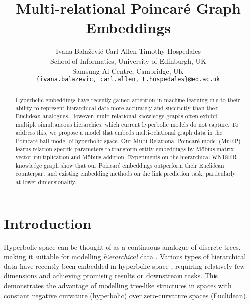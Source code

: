 \documentclass{article}
\title{Multi-relational Poincar{\'e} Graph Embeddings}
\author{Ivana Bala\v{z}evi\'c \hspace{1.cm} Carl Allen \hspace{1.cm} Timothy Hospedales\\
   School of Informatics, University of Edinburgh, UK\\
   Samsung AI Centre, Cambridge, UK \\
  \texttt{\{ivana.balazevic, carl.allen, t.hospedales\}@ed.ac.uk} \\
}
\begin{document}
\maketitle

\begin{abstract}
 Hyperbolic embeddings have recently gained attention in machine learning due to their ability to represent hierarchical data more accurately and succinctly than their Euclidean analogues. However, multi-relational knowledge graphs often exhibit multiple simultaneous hierarchies, which current hyperbolic models do not capture. To address this, we propose a model that embeds multi-relational graph data in the Poincar{\'e} ball model of hyperbolic space. Our Multi-Relational Poincar{\'e} model (MuRP) learns relation-specific parameters to transform entity embeddings by Möbius matrix-vector multiplication and Möbius addition. Experiments on the hierarchical WN18RR knowledge graph show that our Poincar{\'e} embeddings outperform their Euclidean counterpart and existing embedding methods on the link prediction task, particularly at lower dimensionality.
\end{abstract}

\section{Introduction}\label{sec:intro}

Hyperbolic space can be thought of as a continuous analogue of discrete trees, making it suitable for
modelling \textit{hierarchical} data \cite{sarkar2011low, de2018representation}. Various types of hierarchical data have recently been embedded in hyperbolic space \cite{nickel2017poincare, nickel2018learning, gulcehre2019hyperbolic, tifrea2019poincare}, requiring relatively few dimensions and achieving promising results on downstream tasks. This demonstrates the advantage of modelling tree-like structures in spaces with constant negative curvature (hyperbolic) over zero-curvature spaces (Euclidean). 
\end{document}
